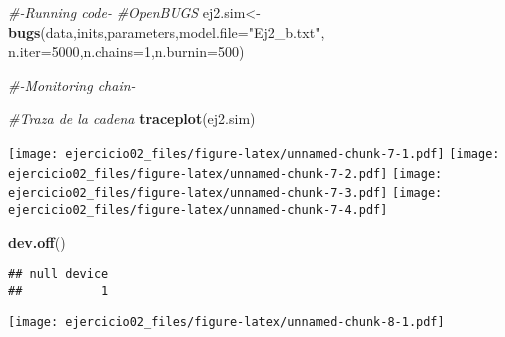 \documentclass[]{article}
\newenvironment{Shaded}{\begin{snugshade}}{\end{snugshade}}
\newcommand{\KeywordTok}[1]{\textcolor[rgb]{0.13,0.29,0.53}{\textbf{{#1}}}}
\newcommand{\DataTypeTok}[1]{\textcolor[rgb]{0.13,0.29,0.53}{{#1}}}
\newcommand{\DecValTok}[1]{\textcolor[rgb]{0.00,0.00,0.81}{{#1}}}
\newcommand{\StringTok}[1]{\textcolor[rgb]{0.31,0.60,0.02}{{#1}}}
\newcommand{\CommentTok}[1]{\textcolor[rgb]{0.56,0.35,0.01}{\textit{{#1}}}}
\newcommand{\OtherTok}[1]{\textcolor[rgb]{0.56,0.35,0.01}{{#1}}}
\newcommand{\NormalTok}[1]{{#1}}
\begin{document}
\begin{Shaded}
\begin{Highlighting}[]
\CommentTok{#-Running code-}
\CommentTok{#OpenBUGS}
\NormalTok{ej2.sim<-}\KeywordTok{bugs}\NormalTok{(data,inits,parameters,}\DataTypeTok{model.file=}\StringTok{"Ej2_b.txt"}\NormalTok{,           }\DataTypeTok{n.iter=}\DecValTok{5000}\NormalTok{,}\DataTypeTok{n.chains=}\DecValTok{1}\NormalTok{,}\DataTypeTok{n.burnin=}\DecValTok{500}\NormalTok{)}

\CommentTok{#-Monitoring chain-}

\CommentTok{#Traza de la cadena}
\KeywordTok{traceplot}\NormalTok{(ej2.sim)}
\end{Highlighting}
\end{Shaded}

\texttt{[image: ejercicio02\_files/figure-latex/unnamed-chunk-7-1.pdf]}
\texttt{[image: ejercicio02\_files/figure-latex/unnamed-chunk-7-2.pdf]}
\texttt{[image: ejercicio02\_files/figure-latex/unnamed-chunk-7-3.pdf]}
\texttt{[image: ejercicio02\_files/figure-latex/unnamed-chunk-7-4.pdf]}

\begin{Shaded}
\begin{Highlighting}[]
\KeywordTok{dev.off}\NormalTok{()}
\end{Highlighting}
\end{Shaded}

\begin{verbatim}
## null device 
##           1
\end{verbatim}

\begin{Shaded}
\end{Shaded}

\texttt{[image: ejercicio02\_files/figure-latex/unnamed-chunk-8-1.pdf]}
\end{document}
